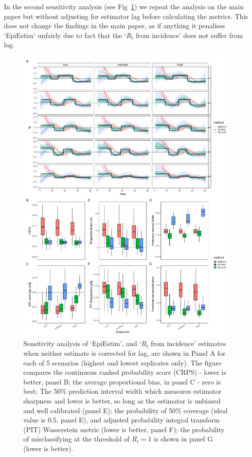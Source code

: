 \documentclass[a4paper, 12pt, twoside]{article}
\begin{document}
In the second sensitivity analysis (see Fig~\ref{fig:S6}) we repeat the analysis on the main paper but without adjusting for estimator lag before calculating the metrics. This does not change the findings in the main paper, as if anything it penalises `EpiEstim' unfairly due to fact that the `$R_t$ from incidence' does not suffer from lag.

\begin{figure}[h!]
\centering
  \includegraphics{fig/fig6-not-lagged-scenario}
  \caption{Sensitivity analysis of `EpiEstim', and `$R_t$ from incidence' estimates when neither estimate is corrected for lag, are shown in Panel A for each of 5 scenarios (highest and lowest replicates only). The figure compares the continuous ranked probability score (CRPS) - lower is better, panel B; the average proportional bias, in panel C - zero is best; The 50\% prediction interval width which measures estimator sharpness and lower is better, so long as the estimator is unbiased and well calibrated (panel E); the probability of 50\% coverage (ideal value is 0.5, panel E), and adjusted probability integral transform (PIT) Wasserstein metric (lower is better, panel F); the probability of misclassifying at the threshold of $R_t=1$ is shown in panel G (lower is better).}
\label{fig:S6}
\end{figure}


\end{document}
